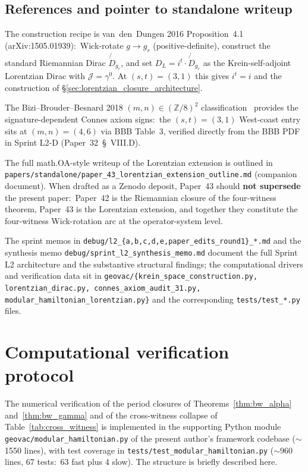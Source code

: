\documentclass[11pt,a4paper]{article}
\theoremstyle{plain}
\theoremstyle{definition}
\begin{document}
\subsection{References and pointer to standalone writeup}
\label{sec:lorentzian_closure_references}

The construction recipe is van~den~Dungen 2016 Proposition~4.1~%
(arXiv:1505.01939):\ Wick-rotate $g \to g_r$ (positive-definite),
construct the standard Riemannian Dirac $\not{\!\!D}_{g_r}$, and set
$D_L = i^t \cdot \not{\!\!D}_{g_r}$ as the Krein-self-adjoint
Lorentzian Dirac with $\mathcal{J} = \gamma^0$.  At $(s, t) = (3, 1)$
this gives $i^t = i$ and the construction of
\S\ref{sec:lorentzian_closure_architecture}.

The Bizi--Brouder--Besnard 2018 $(m, n) \in (\mathbb{Z}/8)^2$
classification~\cite{bizi_brouder_besnard2018} provides the
signature-dependent Connes axiom signs:\ the $(s, t) = (3, 1)$
West-coast entry sits at $(m, n) = (4, 6)$ via BBB Table~3,
verified directly from the BBB PDF in Sprint L2-D (Paper~32~\S~VIII.D).

The full math.OA-style writeup of the Lorentzian extension is
outlined in
\texttt{papers/standalone/paper\_43\_lorentzian\_extension\_outline.md}
(companion document).  When drafted as a Zenodo deposit, Paper~43
should \textbf{not supersede} the present paper:\ Paper~42 is the
Riemannian closure of the four-witness theorem, Paper~43 is the
Lorentzian extension, and together they constitute the
four-witness Wick-rotation arc at the operator-system level.

The sprint memos in \texttt{debug/l2\_\{a,b,c,d,e,paper\_edits\_round1\}\_*.md}
and the synthesis memo \texttt{debug/sprint\_l2\_synthesis\_memo.md}
document the full Sprint L2 architecture and the substantive
structural findings; the computational drivers and verification data
sit in \texttt{geovac/\{krein\_space\_construction.py,
lorentzian\_dirac.py, connes\_axiom\_audit\_31.py,
modular\_hamiltonian\_lorentzian.py\}} and the corresponding
\texttt{tests/test\_*.py} files.

\appendix
\section{Computational verification protocol}
\label{app:computational_verification}

The numerical verification of the period closures of
Theorems~\ref{thm:bw_alpha} and~\ref{thm:bw_gamma} and of the
cross-witness collapse of Table~\ref{tab:cross_witness} is
implemented in the supporting Python module
\verb|geovac/modular_hamiltonian.py| of the present author's framework
codebase ($\sim$1550 lines), with test coverage in
\verb|tests/test_modular_hamiltonian.py| ($\sim$960 lines, 67 tests:\
63 fast plus 4 slow). The structure is briefly described here.
\end{document}

